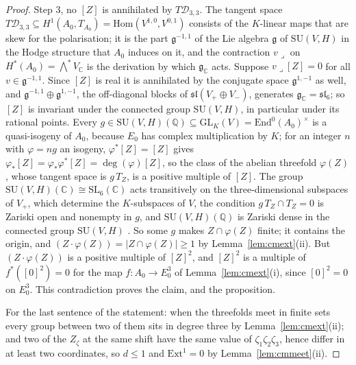 \documentclass[11pt,reqno]{amsart}
\numberwithin{equation}{section}
\theoremstyle{plain}
\theoremstyle{definition}
\newcommand{\QQ}{\mathbb{Q}}
\newcommand{\CC}{\mathbb{C}}
\newcommand{\Ext}{\mathrm{Ext}}
\newcommand{\Hom}{\mathrm{Hom}}
\newcommand{\End}{\mathrm{End}}
\newcommand{\SU}{\mathrm{SU}}
\newcommand{\cD}{\mathcal{D}}
\begin{document}
\begin{proof}
Step 3, no $[Z]$ is annihilated by $T\cD_{3,3}$. The tangent space $T\cD_{3,3}\subseteq H^{1}(A_{0},T_{A_{0}})=\Hom(V^{1,0},V^{0,1})$ consists of the $K$-linear maps that are skew for the polarisation; it is the part $\mathfrak{g}^{-1,1}$ of the Lie algebra $\mathfrak{g}$ of $\SU(V,H)$ in the Hodge structure that $A_{0}$ induces on it, and the contraction $v\lrcorner$ on $H^{*}(A_{0})=\bigwedge^{*}V_{\CC}$ is the derivation by which $\mathfrak{g}_{\CC}$ acts. Suppose $v\lrcorner[Z]=0$ for all $v\in\mathfrak{g}^{-1,1}$. Since $[Z]$ is real it is annihilated by the conjugate space $\mathfrak{g}^{1,-1}$ as well, and $\mathfrak{g}^{-1,1}\oplus\mathfrak{g}^{1,-1}$, the off-diagonal blocks of $\mathfrak{sl}(V_{+}\oplus V_{-})$, generates $\mathfrak{g}_{\CC}=\mathfrak{sl}_{6}$; so $[Z]$ is invariant under the connected group $\SU(V,H)$, in particular under its rational points. Every $g\in\SU(V,H)(\QQ)\subseteq\mathrm{GL}_{K}(V)=\End^{0}(A_{0})^{\times}$ is a quasi-isogeny of $A_{0}$, because $E_{0}$ has complex multiplication by $K$; for an integer $n$ with $\varphi=ng$ an isogeny, $\varphi^{*}[Z]=[Z]$ gives $\varphi_{*}[Z]=\varphi_{*}\varphi^{*}[Z]=\deg(\varphi)[Z]$, so the class of the abelian threefold $\varphi(Z)$, whose tangent space is $g\,T_{Z}$, is a positive multiple of $[Z]$. The group $\SU(V,H)(\CC)\cong\mathrm{SL}_{6}(\CC)$ acts transitively on the three-dimensional subspaces of $V_{+}$, which determine the $K$-subspaces of $V$, the condition $g\,T_{Z}\cap T_{Z}=0$ is Zariski open and nonempty in $g$, and $\SU(V,H)(\QQ)$ is Zariski dense in the connected group $\SU(V,H)$ \cite[Cor.~18.3]{Bor91}. So some $g$ makes $Z\cap\varphi(Z)$ finite; it contains the origin, and $(Z\cdot\varphi(Z))=|Z\cap\varphi(Z)|\ge1$ by Lemma~\ref{lem:cmext}(ii). But $(Z\cdot\varphi(Z))$ is a positive multiple of $[Z]^{2}$, and $[Z]^{2}$ is a multiple of $f^{*}([0]^{2})=0$ for the map $f\colon A_{0}\to E_{0}^{3}$ of Lemma~\ref{lem:cmext}(i), since $[0]^{2}=0$ on $E_{0}^{3}$. This contradiction proves the claim, and the proposition.

For the last sentence of the statement: when the threefolds meet in finite sets every group between two of them sits in degree three by Lemma~\ref{lem:cmext}(ii); and two of the $Z_{\zeta}$ at the same shift have the same value of $\zeta_{1}\zeta_{2}\zeta_{3}$, hence differ in at least two coordinates, so $d\le1$ and $\Ext^{1}=0$ by Lemma~\ref{lem:cmmeet}(ii).
\end{proof}
\end{document}
